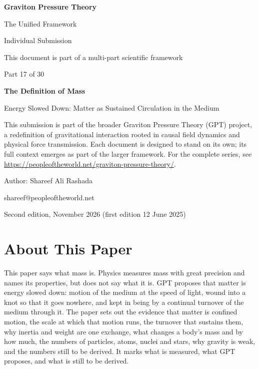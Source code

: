 \documentclass[11pt,a4paper]{article}
\begin{document}
\renewcommand{\thetable}{17.\arabic{table}}
\begin{titlepage}
\centering
\vspace*{1.5cm}
{\Huge\bfseries Graviton Pressure Theory\par}
\vspace{0.4cm}
{\Large The Unified Framework\par}
{\large Individual Submission\par}
\vspace{0.3cm}
{\normalsize This document is part of a multi-part scientific framework\par}
\vspace{1.6cm}
{\large Part 17 of 30\par}
\vspace{0.6cm}
{\huge\bfseries The Definition of Mass\par}
\vspace{0.5cm}
{\Large Energy Slowed Down: Matter as Sustained Circulation in the Medium\par}
\vspace{1.4cm}
\begin{minipage}{0.82\textwidth}\centering\small
This submission is part of the broader Graviton Pressure Theory (GPT) project, a redefinition of gravitational interaction rooted in causal field dynamics and physical force transmission. Each document is designed to stand on its own; its full context emerges as part of the larger framework. For the complete series, see \url{https://peopleoftheworld.net/graviton-pressure-theory/}.
\end{minipage}
\vfill
{\large Author: Shareef Ali Rashada\par}
{\normalsize shareef@peopleoftheworld.net\par}
\vspace{0.3cm}
{\normalsize Second edition, November 2026 \quad (first edition 12 June 2025)\par}
\end{titlepage}

\tableofcontents
\newpage

\section*{About This Paper}

This paper says what mass is. Physics measures mass with great precision and names its properties, but does not say what it is. GPT proposes that matter is energy slowed down: motion of the medium at the speed of light, wound into a knot so that it goes nowhere, and kept in being by a continual turnover of the medium through it. The paper sets out the evidence that matter is confined motion, the scale at which that motion runs, the turnover that sustains them, why inertia and weight are one exchange, what changes a body's mass and by how much, the numbers of particles, atoms, nuclei and stars, why gravity is weak, and the numbers still to be derived. It marks what is measured, what GPT proposes, and what is still to be derived.
\end{document}
